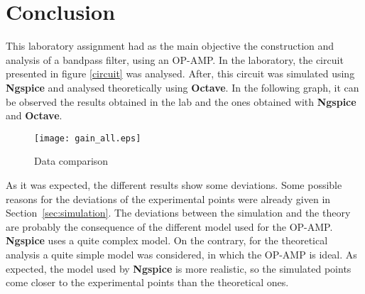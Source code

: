 \section{Conclusion}
\label{sec:conclusion}


This laboratory assignment had as the main objective the construction and analysis of a bandpass filter, using an OP-AMP. In the laboratory, the circuit presented in figure \ref{circuit} was analysed. After, this circuit was simulated using {\bf Ngspice} and analysed theoretically using {\bf Octave}. In the following graph, it can be observed the results obtained in the lab and the ones obtained with {\bf Ngspice} and {\bf Octave}.

\begin{figure}[H]
        \centering
        \texttt{[image: gain\_all.eps]}
        \caption{Data comparison}
        \label{alldata}
\end{figure}

As it was expected, the different results show some deviations. Some possible reasons for the deviations of the experimental points were already given in Section~\ref{sec:simulation}. The deviations between the simulation and the theory are probably the consequence of the different model used for the OP-AMP. {\bf Ngspice} uses a quite complex model. On the contrary, for the theoretical analysis a quite simple model was considered, in which the OP-AMP is ideal. As expected, the model used by {\bf Ngspice} is more realistic, so the simulated points come closer to the experimental points than the theoretical ones.

